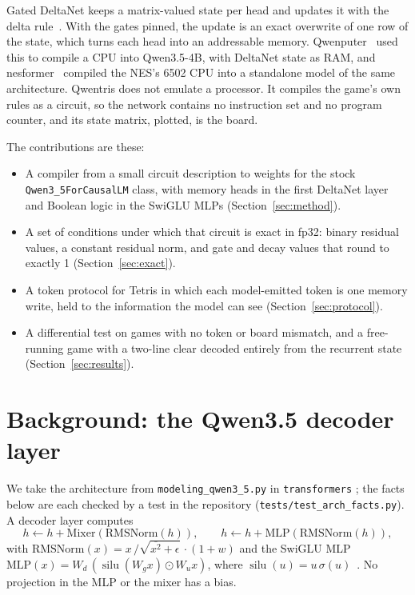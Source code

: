 \documentclass[11pt]{article}
\newcommand{\silu}{\operatorname{silu}}
\begin{document}
Gated DeltaNet keeps a matrix-valued state per head and updates it with the delta rule~\cite{schlag2021linear,yang2024parallelizing}. With the gates pinned, the update is an exact overwrite of one row of the state, which turns each head into an addressable memory. Qwenputer~\cite{qwenputer} used this to compile a CPU into Qwen3.5-4B, with DeltaNet state as RAM, and nesformer~\cite{nesformer} compiled the NES's 6502 CPU into a standalone model of the same architecture. Qwentris does not emulate a processor. It compiles the game's own rules as a circuit, so the network contains no instruction set and no program counter, and its state matrix, plotted, is the board.

The contributions are these:
\begin{itemize}
\item A compiler from a small circuit description to weights for the stock \texttt{Qwen3\_5ForCausalLM} class, with memory heads in the first DeltaNet layer and Boolean logic in the SwiGLU MLPs (Section~\ref{sec:method}).
\item A set of conditions under which that circuit is exact in fp32: binary residual values, a constant residual norm, and gate and decay values that round to exactly 1 (Section~\ref{sec:exact}).
\item A token protocol for Tetris in which each model-emitted token is one memory write, held to the information the model can see (Section~\ref{sec:protocol}).
\item A differential test on \nPtwoGames{} games with no token or board mismatch, and a free-running game with a two-line clear decoded entirely from the recurrent state (Section~\ref{sec:results}).
\end{itemize}

\section{Background: the Qwen3.5 decoder layer}
\label{sec:background}

We take the architecture from \texttt{modeling\_qwen3\_5.py} in \texttt{transformers} \nTfVersion{}; the facts below are each checked by a test in the repository (\texttt{tests/test\_arch\_facts.py}). A decoder layer computes
\begin{equation}
h \leftarrow h + \mathrm{Mixer}(\mathrm{RMSNorm}(h)), \qquad h \leftarrow h + \mathrm{MLP}(\mathrm{RMSNorm}(h)),
\end{equation}
with $\mathrm{RMSNorm}(x) = x \,/\sqrt{\overline{x^2} + \epsilon}\,\cdot (1 + w)$ and the SwiGLU MLP~\cite{shazeer2020glu} $\mathrm{MLP}(x) = W_d\,(\silu(W_g x) \odot W_u x)$, where $\silu(u) = u\,\sigma(u)$~\cite{elfwing2017silu}. No projection in the MLP or the mixer has a bias.
\end{document}
